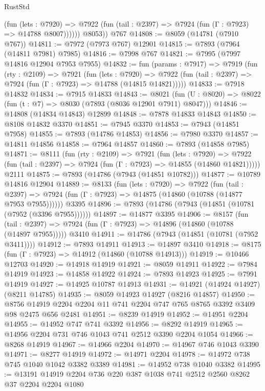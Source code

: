\begin{lexlean}{RustStd}
\begin{coremodule}
{\begin{coremodule}
{{{{{{{{{{{{{{{{{{{{{{{{{{{{{{{{{{{{{{{{{{{{{{{{{{              (fun (lets : @7920) =>
              @7922 (fun (tail : @2397) => @7924 (fun (Γ : @7923) => @14788 @8007))))))
        @8053))
    @767
@14808 := @8059 (@14781 (@7910 @767))
@14811 := @7972 (@7973 @767) @12901
@14815 := @7893 (@7964 (@14811 @7981) @7985)
@14816 := @7998 @767
@14821 := @7995 (@7997 @14816 @12904 @7953 @7955)
@14832 := fun (params : @7917) =>
  @7919
    (fun (rty : @2109) =>
    @7921
      (fun (lets : @7920) =>
      @7922 (fun (tail : @2397) => @7924 (fun (Γ : @7923) => @14788 (@14815 @14821)))))
@14833 := @7918 @14832
@14834 := @7915 @14833
@14843 := @8021
    (fun (U : @8020) => @8022 (fun (t : @7) => @8030 (@7893 (@8036 @12901 @7911) @8047)))
@14846 := @14808 (@14834 @14843) @12899
@14848 := @7878 @14833 @14843
@14850 := @8108 @14832 @3370
@14851 := @7945 @3370
@14853 := @7943 (@14851 @7958)
@14855 := @7893 (@14786 @14853)
@14856 := @7980 @3370
@14857 := @14811 @14856
@14858 := @7964 @14857
@14860 := @7893 (@14858 @7985)
@14871 := @8111
    (fun (rty : @2109) =>
    @7921
      (fun (lets : @7920) =>
      @7922 (fun (tail : @2397) => @7924 (fun (Γ : @7923) => @14855 (@14860 @14821)))))
    @2111
@14875 := @7893 (@14786 (@7943 (@14851 @10782)))
@14877 := @10789 @14816 @12904
@14889 := @8133
    (fun (lets : @7920) =>
    @7922
      (fun (tail : @2397) =>
      @7924 (fun (Γ : @7923) => @14875 (@14860 (@10788 (@14877 @7953 @7955))))))
    @3395
@14896 := @7893 (@14786 (@7943 (@14851 (@10781 (@7952 (@3396 @7955))))))
@14897 := @14877 @3395
@14906 := @8157
    (fun (tail : @2397) => @7924 (fun (Γ : @7923) => @14896 (@14860 (@10788 (@14897 @7955)))))
    @3410
@14911 := @14786 (@7943 (@14851 (@10781 (@7952 @3411))))
@14912 := @7893 @14911
@14913 := @14897 @3410
@14918 := @8175 (fun (Γ : @7923) => @14912 (@14860 (@10788 @14913)))
@14919 := @10466 @12703
@14920 := @14918 @14919
@14921 := @8059 @14911
@14922 := @7984 @14919
@14923 := @14858 @14922
@14924 := @7893 @14923
@14925 := @7991 @14919
@14927 := @14925 @10787 @14913
@14931 := @14921 (@14924 @14927) (@8211 @14785)
@14935 := @8059 @14923 @14927 (@8216 @14857)
@14950 := @8756 @14919 @2204 @2204 @11 @741 @2204 @747 @765 @8765 @3392 @3409 @98 @2475 @656 @2481
@14951 := @8239 @14919
@14952 := @14951 @2204
@14955 := @14952 @747 @741 @3392
@14956 := @8292 @14919
@14965 := @14956 @2204 @731 @746 @1043 @741 @2512 @3390 @2204 @1054
@14966 := @8268 @14919
@14967 := @14966 @2204
@14970 := @14967 @746 @1043 @3390
@14971 := @8277 @14919
@14972 := @14971 @2204
@14978 := @14972 @738 @745 @1040 @1042 @3382 @3389
@14981 := @14952 @738 @1040 @3382
@14995 := @13191 @14919 @2204 @736 @220 @387 @1038 @741 @2512 @2560 @8262 @37 @2204 @2204 @1080
}}}}}}}}}}}}}}}}}}}}}}}}}}}}}}}}}}}}}}}}}}}}}}}}}}
\end{coremodule}}
\end{coremodule}
\end{lexlean}
